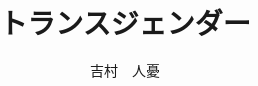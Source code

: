 \documentclass[11pt,a5paper,a5j, oneside]{tbook}
\title{トランスジェンダー}
\author{吉村　人憂}
\begin{document}
\maketitle

\clearpage

\tableofcontents

\chapter{}


\end{document}
